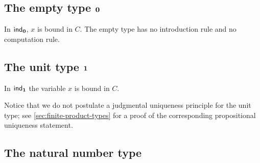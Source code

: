 \subsection{The empty type \texorpdfstring{$\mathbf{0}$}{0}}

%

%
In $\mathsf{ind}_{\mathbf{0}}$, $x$ is bound in $C$. The empty type has no introduction rule and no computation rule.

%

\subsection{The unit type \texorpdfstring{$\mathbf{1}$}{1}}
\label{sec:more-formal-unit}

%

%
In $\mathsf{ind}_{\mathbf{1}}$ the variable $x$ is bound in $C$.

Notice that we do not postulate a judgmental uniqueness principle for the unit
type; see \cref{sec:finite-product-types} for a proof of the corresponding
propositional uniqueness statement.

%

\subsection{The natural number type}

